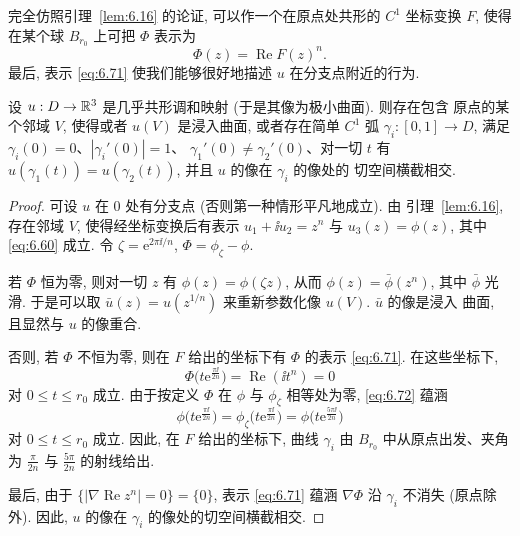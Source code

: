 完全仿照引理~\ref{lem:6.16} 的论证, 可以作一个在原点处共形的 $C^1$
坐标变换 $F$, 使得在某个球 $B_{r_0}$ 上可把 $\Phi$ 表示为
\begin{equation}
\Phi(z)=\operatorname{Re}F(z)^n.
\label{eq:6.71}
\end{equation}
最后, 表示 \eqref{eq:6.71} 使我们能够很好地描述 $u$ 在分支点附近的行为.

\begin{theorem}
\label{thm:6.18}
设 $u:D\to\mathbb{R}^3$ 是几乎共形调和映射 (于是其像为极小曲面). 则存在包含
原点的某个邻域 $V$, 使得或者 $u(V)$ 是浸入曲面, 或者存在简单 $C^1$ 弧
$\gamma_i:[0,1]\to D$, 满足 $\gamma_i(0)=0$、$|\gamma_i'(0)|=1$、
$\gamma_1'(0)\neq\gamma_2'(0)$、对一切 $t$ 有
$u(\gamma_1(t))=u(\gamma_2(t))$, 并且 $u$ 的像在 $\gamma_i$ 的像处的
切空间横截相交.
\end{theorem}

\begin{proof}
可设 $u$ 在 $0$ 处有分支点 (否则第一种情形平凡地成立). 由
引理~\ref{lem:6.16}, 存在邻域 $V$, 使得经坐标变换后有表示
$u_1+\ii u_2=z^n$ 与 $u_3(z)=\phi(z)$, 其中 \eqref{eq:6.60} 成立. 令
$\zeta=\mathrm{e}^{2\pi\ii/n}$, $\Phi=\phi_\zeta-\phi$.

若 $\Phi$ 恒为零, 则对一切 $z$ 有 $\phi(z)=\phi(\zeta z)$, 从而
$\phi(z)=\bar{\phi}(z^n)$, 其中 $\bar{\phi}$ 光滑. 于是可以取
$\bar{u}(z)=u(z^{1/n})$ 来重新参数化像 $u(V)$. $\bar{u}$ 的像是浸入
曲面, 且显然与 $u$ 的像重合.

否则, 若 $\Phi$ 不恒为零, 则在 $F$ 给出的坐标下有 $\Phi$ 的表示
\eqref{eq:6.71}. 在这些坐标下,
\begin{equation}
\Phi\bigl(t\mathrm{e}^{\frac{\pi\ii}{2n}}\bigr)
=\operatorname{Re}(\ii t^n)=0
\label{eq:6.72}
\end{equation}
对 $0\leq t\leq r_0$ 成立. 由于按定义 $\Phi$ 在 $\phi$ 与 $\phi_\zeta$
相等处为零, \eqref{eq:6.72} 蕴涵
\begin{equation}
\phi\bigl(t\mathrm{e}^{\frac{\pi\ii}{2n}}\bigr)
=\phi_\zeta\bigl(t\mathrm{e}^{\frac{\pi\ii}{2n}}\bigr)
=\phi\bigl(t\mathrm{e}^{\frac{5\pi\ii}{2n}}\bigr)
\label{eq:6.73}
\end{equation}
对 $0\leq t\leq r_0$ 成立. 因此, 在 $F$ 给出的坐标下, 曲线 $\gamma_i$
由 $B_{r_0}$ 中从原点出发、夹角为 $\frac{\pi}{2n}$ 与 $\frac{5\pi}{2n}$
的射线给出.

最后, 由于 $\{|\nabla\operatorname{Re}z^n|=0\}=\{0\}$, 表示
\eqref{eq:6.71} 蕴涵 $\nabla\Phi$ 沿 $\gamma_i$ 不消失 (原点除外). 因此,
$u$ 的像在 $\gamma_i$ 的像处的切空间横截相交.
\end{proof}

